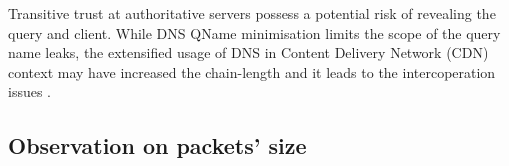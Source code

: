 Transitive trust at authoritative servers possess a potential risk of revealing the query and client. While DNS QName minimisation \cite{bortzmeyer2016dns} limits the scope of the query name leaks, the extensified usage of DNS in Content Delivery Network (CDN) context \cite{WANG2018235} may have increased the chain-length and it leads to the intercoperation issues \cite{Huque-QNAME-Min-analysis}.

\subsection{Observation on packets' size}
